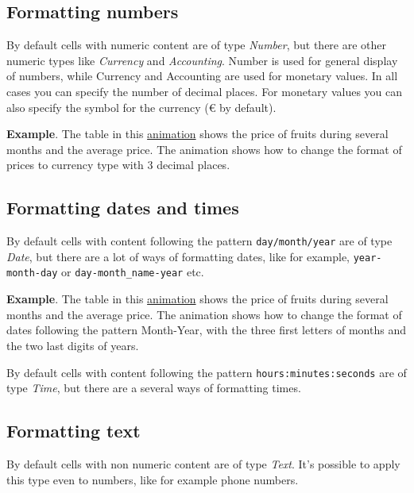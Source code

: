 \subsection{Formatting numbers}\hypertarget{formatting-numbers}{}\label{formatting-numbers}

By default cells with numeric content are of type \emph{Number}, but there are other numeric types like \emph{Currency} and \emph{Accounting}. Number is used for general display of numbers, while Currency and Accounting are used for monetary values. In all cases you can specify the number of decimal places. For monetary values you can also specify the symbol for the currency (€ by default).

\textbf{Example}. The table in this \href{http://aprendeconalf.es/office/excel/manual/img/example_number_format.gif}{animation} shows the price of fruits during several months and the average price. The animation shows how to change the format of prices to currency type with 3 decimal places.

\subsection{Formatting dates and times}\hypertarget{formatting-dates-and-times}{}\label{formatting-dates-and-times}

By default cells with content following the pattern \texttt{day/month/year} are of type \emph{Date}, but there are a lot of ways of formatting dates, like for example, \texttt{year-month-day} or \texttt{day-month\_name-year} etc.

\textbf{Example}. The table in this \href{http://aprendeconalf.es/office/excel/manual/img/example_date_format.gif}{animation} shows the price of fruits during several months and the average price. The animation shows how to change the format of dates following the pattern Month-Year, with the three first letters of months and the two last digits of years.

By default cells with content following the pattern \texttt{hours:minutes:seconds} are of type \emph{Time}, but there are a several ways of formatting times.

\subsection{Formatting text}\hypertarget{formatting-text}{}\label{formatting-text}

By default cells with non numeric content are of type \emph{Text}. It's possible to apply this type even to numbers, like for example phone numbers.

